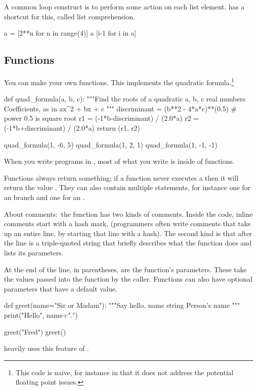 A common loop construct is to perform some action
on each list element.
\python{} has a shortcut for this, called list comprehension.
\begin{pythonconsole}
a = [2**n for n in range(4)]
a
[i-1 for i in a]
\end{pythonconsole}



\subsection{Functions}
You can make your own functions.
This implements the quadratic formula.\footnote{%
  This code is naive, for instance in that it does not address the
  potential floating point issues.}
\begin{pythonconsole}
def quad_formula(a, b, c):
    """Find the roots of a quadratic 
      a, b, c  real numbers  Coefficients, as in ax^2 + bx + c
    """
    discriminant = (b**2 - 4*a*c)**(0.5)  # power 0.5 is square root
    r1 = (-1*b-discriminant) / (2.0*a)
    r2 = (-1*b+discriminant) / (2.0*a)
    return (r1, r2)

quad_formula(1, -6, 5)
quad_formula(1, 2, 1)
quad_formula(1, -1, -1)
\end{pythonconsole}
When you write programs in \python{}, most of what you write
is inside of functions. 

Functions always return something; 
if a function never executes a  then it will
return the value .
They can also contain multiple  statements, for instance 
one for an  branch and one for an .

About comments:~the  function has two kinds of 
comments.
Inside the code, inline comments start with a hash mark, \inlinecode{\#}
(programmers often write comments that take up an entire line, by starting 
that line with a hash). 
The second kind is that
after the  line is a triple-quoted string that
briefly describes
what the function does and lists its parameters.

At the end of the  line, in parentheses, are
the function's parameters. 
These take the values 
passed into the function by the caller.
Functions can also have optional parameters that have a default value.
\begin{pythonconsole}
def greet(name="Sir or Madam"):
    """Say hello.
      name  string  Person's name
    """
    print("Hello", name+".")

greet("Fred")
greet()
\end{pythonconsole}
\Sage{}  heavily uses this feature of \python{}.







